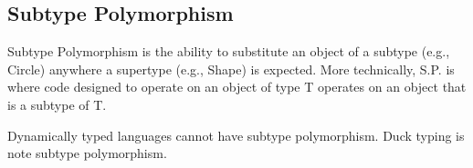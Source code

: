 \subsection*{Subtype Polymorphism}
Subtype Polymorphism is the ability to substitute an object of a subtype
(e.g., Circle) anywhere a supertype (e.g., Shape) is expected. More
technically, S.P. is where code designed to operate on an object of type
T operates on an object that is a subtype of T.

Dynamically typed languages cannot have subtype polymorphism. Duck
typing is note subtype polymorphism.
